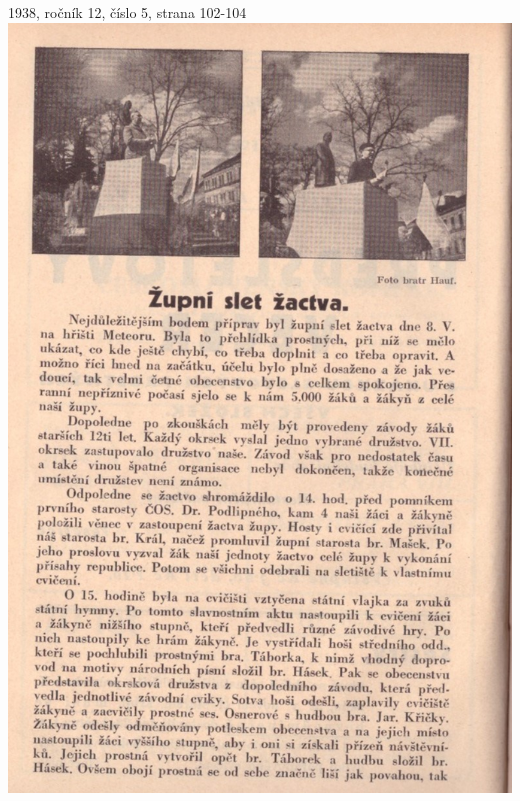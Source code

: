 \documentclass[11pt]{article}
\begin{document}
1938, ročník 12, číslo 5, strana 102-104 \\
\includegraphics[width=\imagewidth]{original/1938/Skener_20250318 (5).jpg}
\end{document}
